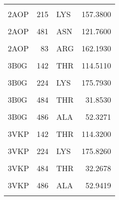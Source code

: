 \begin{table}
\begin{tabular}{lrlr}
			\addlinespace
			\cellcolor{gray!6}{2AOP} & \cellcolor{gray!6}{153} & \cellcolor{gray!6}{ARG} & \cellcolor{gray!6}{144.7120}\\
			2AOP & 215 & LYS & 157.3800\\
			\cellcolor{gray!6}{2AOP} & \cellcolor{gray!6}{217} & \cellcolor{gray!6}{LYS} & \cellcolor{gray!6}{135.7480}\\
			2AOP & 481 & ASN & 121.7600\\
			\cellcolor{gray!6}{2AOP} & \cellcolor{gray!6}{483} & \cellcolor{gray!6}{CYS} & \cellcolor{gray!6}{115.6650}\\
			\addlinespace
			2AOP & 83 & ARG & 162.1930\\
			\cellcolor{gray!6}{3B0G} & \cellcolor{gray!6}{109} & \cellcolor{gray!6}{ARG} & \cellcolor{gray!6}{157.7590}\\
			3B0G & 142 & THR & 114.5110\\
			\cellcolor{gray!6}{3B0G} & \cellcolor{gray!6}{179} & \cellcolor{gray!6}{ARG} & \cellcolor{gray!6}{150.2730}\\
			3B0G & 224 & LYS & 175.7930\\
			\addlinespace
			\cellcolor{gray!6}{3B0G} & \cellcolor{gray!6}{483} & \cellcolor{gray!6}{ASN} & \cellcolor{gray!6}{124.8060}\\
			3B0G & 484 & THR & 31.8530\\
			\cellcolor{gray!6}{3B0G} & \cellcolor{gray!6}{485} & \cellcolor{gray!6}{CYS} & \cellcolor{gray!6}{114.2180}\\
			3B0G & 486 & ALA & 52.3271\\
			\cellcolor{gray!6}{3VKP} & \cellcolor{gray!6}{109} & \cellcolor{gray!6}{ARG} & \cellcolor{gray!6}{159.0060}\\
			\addlinespace
			3VKP & 142 & THR & 114.3200\\
			\cellcolor{gray!6}{3VKP} & \cellcolor{gray!6}{179} & \cellcolor{gray!6}{ARG} & \cellcolor{gray!6}{149.5410}\\
			3VKP & 224 & LYS & 175.8260\\
			\cellcolor{gray!6}{3VKP} & \cellcolor{gray!6}{483} & \cellcolor{gray!6}{ASN} & \cellcolor{gray!6}{125.9350}\\
			3VKP & 484 & THR & 32.2678\\
			\addlinespace
			\cellcolor{gray!6}{3VKP} & \cellcolor{gray!6}{485} & \cellcolor{gray!6}{CYS} & \cellcolor{gray!6}{113.1560}\\
			3VKP & 486 & ALA & 52.9419\\
			\cellcolor{gray!6}{3VLX} & \cellcolor{gray!6}{109} & \cellcolor{gray!6}{ARG} & \cellcolor{gray!6}{157.8390}\\

\end{tabular}
\end{table}

